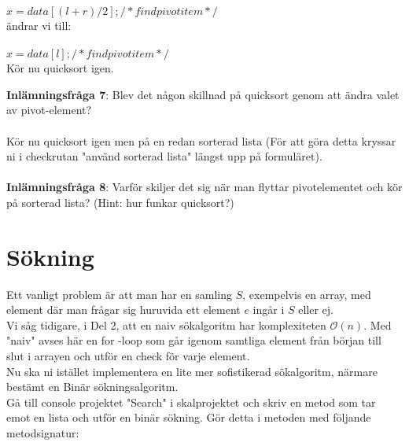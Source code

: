 \documentclass{article}
\begin{document}
$x = data[(l + r) / 2]; /* find pivot item */$ \\

ändrar vi till: \\\\
$x = data[l]; /* find pivot item */$ \\

Kör nu quicksort igen.%

\textbf{Inlämningsfråga 7}: Blev det någon skillnad på quicksort genom att ändra valet av pivot-element?  \\\\

Kör nu quicksort igen men på en redan sorterad lista (För att göra detta kryssar ni i checkrutan "använd sorterad lista" längst upp på formuläret).\\\\


\textbf{Inlämningsfråga 8}: Varför skiljer det sig när man flyttar pivotelementet och kör på sorterad lista? (Hint: hur funkar quicksort?)


\section*{Sökning}
Ett vanligt problem är att man har en samling $S$, exempelvis en array, med element där man frågar sig huruvida ett element $e$ ingår i $S$ eller ej. \\
Vi såg tidigare, i Del 2, att en naiv sökalgoritm har komplexiteten ${\mathcal{O}(n)}$.  Med "naiv" avses här en for -loop
som går igenom samtliga element från början till slut i arrayen och utför en check för varje element.\\

Nu ska ni istället implementera en lite mer sofistikerad sökalgoritm, närmare bestämt en Binär sökningsalgoritm.\\

Gå till console projektet "Search" i skalprojektet och skriv en metod som tar emot en lista och utför en binär sökning. Gör detta i metoden med följande metodsignatur:
\end{document}
